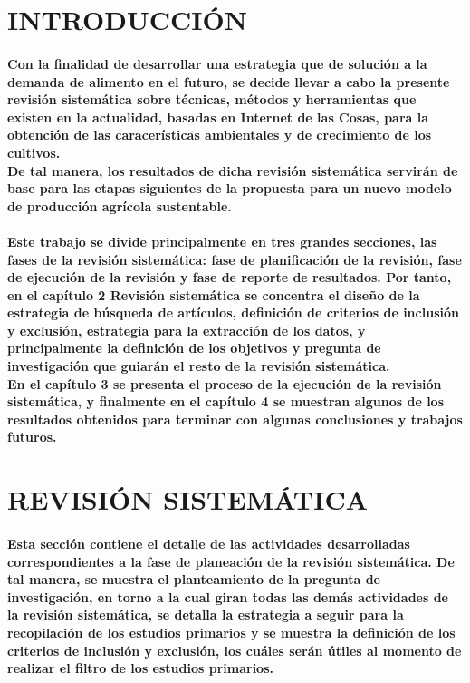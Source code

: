 \documentclass[10pt, twocolumn]{article}
\begin{document}
\section{INTRODUCCIÓN}
\paragraph{Con la finalidad de desarrollar una estrategia que de solución a la demanda de alimento en el futuro, se decide llevar a cabo la presente revisión sistemática sobre técnicas, métodos y herramientas que existen en la actualidad, basadas en Internet de las Cosas, para la obtención de las caracerísticas ambientales y de crecimiento de los cultivos. \\ De tal manera, los resultados de dicha revisión sistemática servirán de base para las etapas siguientes de la propuesta para un nuevo modelo de producción agrícola sustentable.}

\paragraph{Este trabajo se divide principalmente en tres grandes secciones, las fases de la revisión sistemática: fase de planificación de la revisión, fase de ejecución de la revisión y fase de reporte de resultados. Por tanto, en el capítulo 2 Revisión sistemática se concentra el diseño de la estrategia de búsqueda de artículos, definición de criterios de inclusión y exclusión, estrategia para la extracción de los datos, y principalmente la definición de los objetivos y pregunta de investigación que guiarán el resto de la revisión sistemática. \\ En el capítulo 3 se presenta el proceso de la ejecución de la revisión sistemática, y finalmente en el capítulo 4 se muestran algunos de los resultados obtenidos para terminar con algunas conclusiones y trabajos futuros.}

\section{REVISIÓN SISTEMÁTICA}
\paragraph{Esta sección contiene el detalle de las actividades desarrolladas correspondientes a la fase de planeación de la revisión sistemática. De tal manera, se muestra el planteamiento de la pregunta de investigación, en torno a la cual giran todas las demás actividades de la revisión sistemática, se detalla la estrategia a seguir para la recopilación de los estudios primarios y se muestra la definición de los criterios de inclusión y exclusión, los cuáles serán útiles al momento de realizar el filtro de los estudios primarios.}
\end{document}
